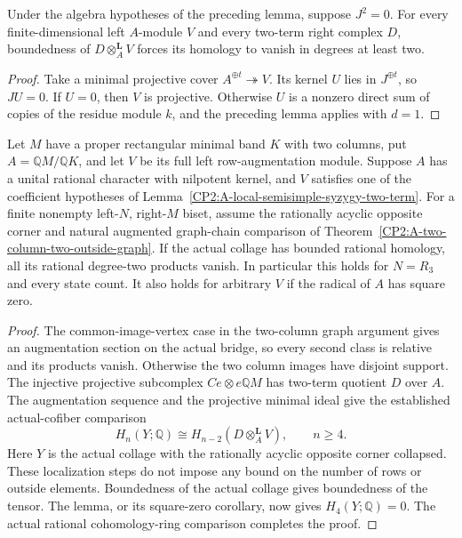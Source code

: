\begin{corollary}
\label{CP2:A-local-square-zero-two-term}
Under the algebra hypotheses of the preceding lemma, suppose $J^2=0$.
For every finite-dimensional left $A$-module $V$ and every two-term
right complex $D$, boundedness of $D\otimes_A^{\mathbf L}V$ forces
its homology to vanish in degrees at least two.
\end{corollary}
\begin{proof}
Take a minimal projective cover $A^{\oplus t}\twoheadrightarrow V$.
Its kernel $U$ lies in $J^{\oplus t}$, so $JU=0$.
If $U=0$, then $V$ is projective.  Otherwise $U$ is a nonzero
direct sum of copies of the residue module $k$, and the preceding
lemma applies with $d=1$.
\end{proof}

\begin{theorem}
\label{CP2:A-local-semisimple-syzygy-row-graph}
Let $M$ have a proper rectangular minimal band $K$ with two columns,
put $A=\mathbb QM/\mathbb QK$, and let $V$ be its full left
row-augmentation module.  Suppose $A$ has a unital rational character
with nilpotent kernel, and $V$ satisfies one of the coefficient
hypotheses of Lemma~\ref{CP2:A-local-semisimple-syzygy-two-term}.
For a finite nonempty left-$N$, right-$M$ biset, assume the rationally
acyclic opposite corner and natural augmented graph-chain comparison
of Theorem~\ref{CP2:A-two-column-two-outside-graph}.
If the actual collage has bounded rational homology, all its rational
degree-two products vanish.  In particular this holds for $N=R_3$
and every state count.  It also holds for arbitrary $V$ if the
radical of $A$ has square zero.
\end{theorem}
\begin{proof}
The common-image-vertex case in the two-column graph argument gives
an augmentation section on the actual bridge, so every second class
is relative and its products vanish.
Otherwise the two column images have disjoint support.  The injective
projective subcomplex $Ce\otimes e\mathbb QM$ has two-term quotient
$D$ over $A$.  The augmentation sequence and the projective minimal
ideal give the established actual-cofiber comparison
\[
 H_n(Y;\mathbb Q)
   \cong H_{n-2}(D\otimes_A^{\mathbf L}V),\qquad n\ge4.
\]
Here $Y$ is the actual collage with the rationally acyclic opposite
corner collapsed.  These localization steps do not impose any bound
on the number of rows or outside elements.
Boundedness of the actual collage gives boundedness of the tensor.
The lemma, or its square-zero corollary, now gives $H_4(Y;\mathbb Q)=0$.
The actual rational cohomology-ring comparison completes the proof.
\end{proof}

